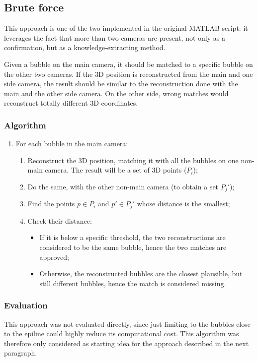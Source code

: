 \subsection{Brute force}
\label{sec:match:bruteforce}

This approach is one of the two implemented in the original MATLAB script: it leverages the fact that more than two cameras are present, not only as a confirmation, but as a knowledge-extracting method.

Given a bubble on the main camera, it should be matched to a specific bubble on the other two cameras.
If the 3D position is reconstructed from the main and one side camera, the result should be similar to the reconstruction done with the main and the other side camera.
On the other side, wrong matches would reconstruct totally different 3D coordinates.

\subsubsection{Algorithm}

\begin{enumerate}
	\itemsep 0em
	\item For each bubble in the main camera:
	      \begin{enumerate}
		      \item Reconstruct the 3D position, matching it with all the bubbles on one non-main camera. The result will be a set of 3D points ($P_i$);
		      \item Do the same, with the other non-main camera (to obtain a set $P_j'$);
		      \item Find the points $p\in P_i$ and $p'\in P_j'$ whose distance is the smallest;
		      \item Check their distance:
		            \begin{itemize}
			            \item If it is below a specific threshold, the two reconstructions are considered to be the same bubble, hence the two matches are approved;
			            \item Otherwise, the reconstructed bubbles are the closest plausible, but still different bubbles, hence the match is considered missing.
		            \end{itemize}
	      \end{enumerate}
\end{enumerate}

\subsubsection{Evaluation}

This approach was not evaluated directly, since just limiting to the bubbles close to the epiline could highly reduce its computational cost.
This algorithm was therefore only considered as starting idea for the approach described in the next paragraph.
